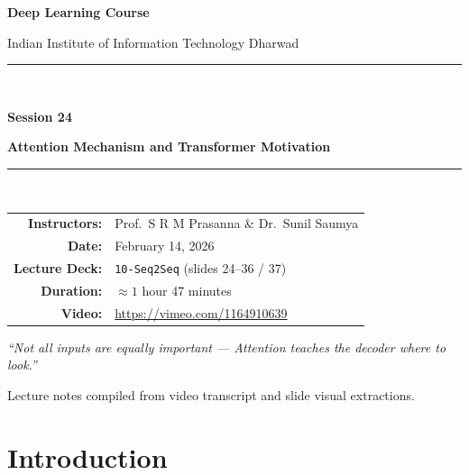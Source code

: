 \documentclass[12pt,a4paper]{article}
\begin{document}
\begin{titlepage}
  \centering
  \vspace*{2cm}
  {\LARGE\bfseries Deep Learning Course\par}
  \vspace{0.5cm}
  {\large Indian Institute of Information Technology Dharwad\par}
  \vspace{1.5cm}
  \rule{\linewidth}{0.5mm}\\[0.4cm]
  {\huge\bfseries Session 24\par}
  \vspace{0.3cm}
  {\Large\bfseries Attention Mechanism and Transformer Motivation\par}
  \rule{\linewidth}{0.5mm}\\[1.5cm]

  \begin{tabular}{rl}
    \textbf{Instructors:}  & Prof.\ S R M Prasanna \& Dr.\ Sunil Saumya \\[4pt]
    \textbf{Date:}         & February 14, 2026                           \\[4pt]
    \textbf{Lecture Deck:} & \texttt{10-Seq2Seq} (slides 24--36 / 37)    \\[4pt]
    \textbf{Duration:}     & $\approx 1$ hour 47 minutes                 \\[4pt]
    \textbf{Video:}        & \url{https://vimeo.com/1164910639}          \\
  \end{tabular}

  \vfill
  {\large\itshape
    ``Not all inputs are equally important ---
    Attention teaches the decoder where to look.''\par}
  \vspace{1cm}
  {\normalsize Lecture notes compiled from video transcript and slide
    visual extractions.\par}
\end{titlepage}

\tableofcontents
\newpage

\section{Introduction}
\label{sec:intro}
\end{document}
